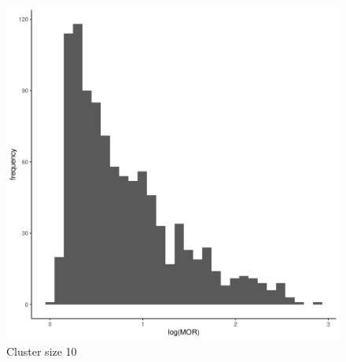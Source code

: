 \documentclass[
  letterpaper,
  DIV=11,
  numbers=noendperiod,
  titlepage]{scrartcl}
\begin{document}
\begin{figure}
\begin{minipage}[t]{0.24\linewidth}
{{\includegraphics{../../plots/two-lvl-ran-slope/low-prev/hist_10_10_two_lvl_slp_low_prev_q2.png}

}

\caption{Cluster size 10}

}

\end{minipage}%
%
\begin{minipage}[t]{0.24\linewidth}

{\centering 

}
\end{minipage}
\end{figure}
\end{document}

